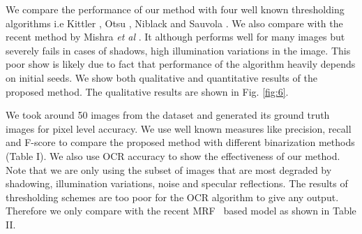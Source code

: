\begin{table}[ht]
\centering
 \caption{Quantitative Results (Average)}
\end{table}
\begin{table}[ht]
\centering
 \caption{OCR Accuracy (\%)}
\end{table}

We compare the performance of our method with four well known thresholding algorithms 
i.e Kittler \cite{A5}, Otsu \cite{A2}, Niblack \cite{A9} and Sauvola \cite{A6}.
We also compare with the recent method by Mishra \emph{et al} \cite{A16}.
It although performs well for many images but severely
fails in cases of shadows, high illumination variations 
in the image. This poor show is likely due to fact that
performance of the algorithm heavily depends on initial seeds.
We show both qualitative and quantitative results of the proposed method. 
The qualitative results are shown in Fig. \ref{fig:6}.

We took around 50
images from the dataset and generated its ground truth images for pixel level accuracy.
We use well known measures like precision, recall and F-score to
compare the proposed method with different binarization methods (Table I).
We also use OCR accuracy to show the effectiveness of our method. Note that we are only
using the subset of images that are most degraded by shadowing, illumination variations,
noise and specular reflections. The results of thresholding schemes are too poor for the
OCR algorithm to give any output. Therefore we only compare with the recent MRF~\cite{A16}
based model as shown in Table II.


